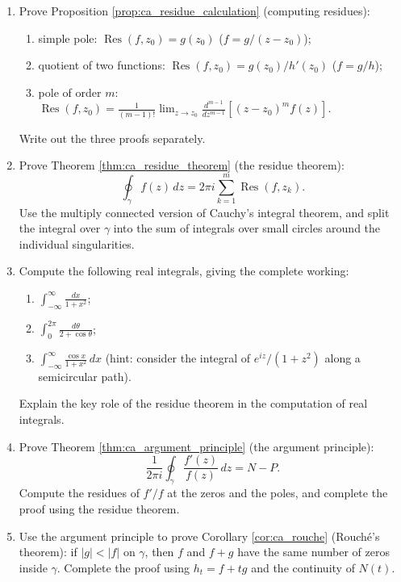 \begin{enumerate}[leftmargin=3em, label=\textbf{Exercise \arabic*}]
    \item Prove Proposition \ref{prop:ca_residue_calculation} (computing residues):
    \begin{enumerate}[label=(\roman*)]
        \item simple pole: $\operatorname{Res}(f,z_0)=g(z_0)$ ($f=g/(z-z_0)$);
        \item quotient of two functions: $\operatorname{Res}(f,z_0)=g(z_0)/h'(z_0)$ ($f=g/h$);
        \item pole of order $m$: $\operatorname{Res}(f,z_0)=\frac{1}{(m-1)!}\lim_{z\to z_0}\frac{d^{m-1}}{dz^{m-1}}[(z-z_0)^m f(z)]$.
    \end{enumerate}
    Write out the three proofs separately.

    \item Prove Theorem \ref{thm:ca_residue_theorem} (the residue theorem):
    \[
    \oint_\gamma f(z)\,dz=2\pi i\sum_{k=1}^m\operatorname{Res}(f,z_k).
    \]
    Use the multiply connected version of Cauchy's integral theorem,
    and split the integral over $\gamma$ into the sum of integrals over small circles around the individual singularities.

    \item Compute the following real integrals, giving the complete working:
    \begin{enumerate}[label=(\roman*)]
        \item $\displaystyle\int_{-\infty}^{\infty}\frac{dx}{1+x^2}$;
        \item $\displaystyle\int_0^{2\pi}\frac{d\theta}{2+\cos\theta}$;
        \item $\displaystyle\int_{-\infty}^{\infty}\frac{\cos x}{1+x^2}\,dx$ (hint: consider the integral of $e^{iz}/(1+z^2)$ along a semicircular path).
    \end{enumerate}
    Explain the key role of the residue theorem in the computation of real integrals.

    \item Prove Theorem \ref{thm:ca_argument_principle} (the argument principle):
    \[
    \frac{1}{2\pi i}\oint_\gamma\frac{f'(z)}{f(z)}\,dz=N-P.
    \]
    Compute the residues of $f'/f$ at the zeros and the poles,
    and complete the proof using the residue theorem.

    \item Use the argument principle to prove Corollary \ref{cor:ca_rouche} (Rouché's theorem):
    if $|g|<|f|$ on $\gamma$,
    then $f$ and $f+g$ have the same number of zeros inside $\gamma$.
    Complete the proof using $h_t=f+tg$ and the continuity of $N(t)$.


\end{enumerate}
